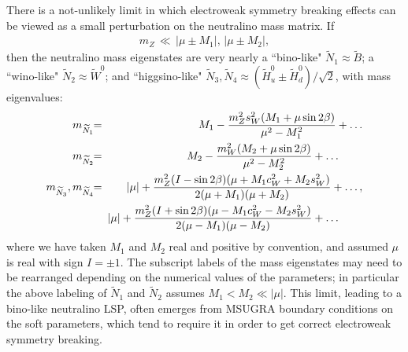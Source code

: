 \documentclass[12pt]{article}
\def\beq{\begin{eqnarray}}
\def\eeq{\end{eqnarray}}
\def\stilde{\widetilde}
\begin{document}
There is a not-unlikely limit in which electroweak symmetry breaking 
effects can be viewed as a small perturbation on the neutralino mass 
matrix. If
\beq
m_Z \,\ll\, |\mu \pm M_{1}|,\, |\mu \pm M_{2}| ,
\label{gauginolike}
\eeq
then the neutralino mass eigenstates are very nearly a ``bino-like" 
$\stilde N_1 \approx \stilde B$; a ``wino-like" $\stilde N_2 \approx 
\stilde W^0$; and ``higgsino-like" $\stilde N_3, \stilde N_4 \approx 
(\stilde H_u^0 \pm \stilde H_d^0)/\sqrt{2}$, with mass eigenvalues:
\beq
m_{{\stilde N}_1}\!\! &=&\!\! M_1 -
{ m_Z^2 s^2_W (M_1 + \mu \sin 2 \beta ) \over \mu^2 - M_1^2 }
+\ldots
\\
m_{{\stilde N}_2}\!\! &=&\!\! M_2 -
{ m_W^2 (M_2 + \mu \sin 2 \beta ) \over \mu^2 - M_2^2 }
+\ldots \qquad {}\\
m_{{\stilde N}_3}, m_{{\stilde N}_4}\!\! &=&\!\! |\mu|  +
{m_Z^2  (I - \sin 2 \beta) (\mu + M_1 c^2_W +M_2 s^2_W)
\over 2 (\mu + M_1) (\mu + M_2) }
+\ldots, \\
&&\!\!\! |\mu|  +
{m_Z^2  (I + \sin 2 \beta) (\mu - M_1 c^2_W - M_2 s^2_W)
\over 2 (\mu - M_1) (\mu - M_2) }
+\ldots \qquad {}
\eeq
where we have taken $M_1$ and $M_2$ real and positive by convention, and 
assumed $\mu$ is real with sign $I = \pm 1$. The subscript labels 
of the mass eigenstates may need to be rearranged depending on the 
numerical values of the parameters; in particular the above labeling of 
$\stilde N_1$ and $\stilde N_2$ assumes $M_1< M_2 \ll |\mu|$. This limit, 
leading to a bino-like neutralino LSP, often emerges from MSUGRA
boundary conditions on the soft 
parameters, which tend to 
require it in order to get correct electroweak symmetry breaking.
\end{document}
